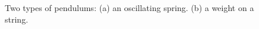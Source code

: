 \begin{figure}[!!!h!!!tb]
\caption{Two types of pendulums: (a) an oscillating spring. (b) a weight on a string.\label{Pendulums}}
\end{figure}

